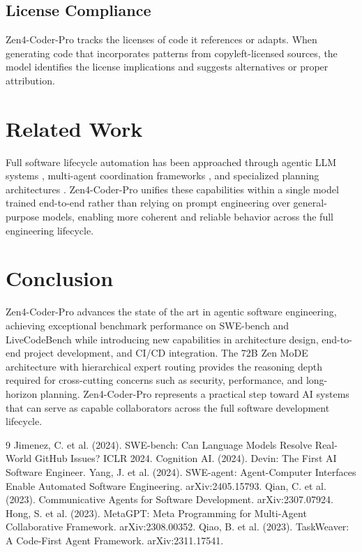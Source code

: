 \documentclass[11pt,a4paper]{article}
\begin{document}
\subsection{License Compliance}

Zen4-Coder-Pro tracks the licenses of code it references or adapts. When generating code that incorporates patterns from copyleft-licensed sources, the model identifies the license implications and suggests alternatives or proper attribution.

\section{Related Work}

Full software lifecycle automation has been approached through agentic LLM systems \cite{devin,swebenchagent}, multi-agent coordination frameworks \cite{chatdev,metagpt}, and specialized planning architectures \cite{taskweaver}. Zen4-Coder-Pro unifies these capabilities within a single model trained end-to-end rather than relying on prompt engineering over general-purpose models, enabling more coherent and reliable behavior across the full engineering lifecycle.

\section{Conclusion}

Zen4-Coder-Pro advances the state of the art in agentic software engineering, achieving exceptional benchmark performance on SWE-bench and LiveCodeBench while introducing new capabilities in architecture design, end-to-end project development, and CI/CD integration. The 72B Zen MoDE architecture with hierarchical expert routing provides the reasoning depth required for cross-cutting concerns such as security, performance, and long-horizon planning. Zen4-Coder-Pro represents a practical step toward AI systems that can serve as capable collaborators across the full software development lifecycle.

\begin{thebibliography}{9}
 Jimenez, C. et al. (2024). SWE-bench: Can Language Models Resolve Real-World GitHub Issues? ICLR 2024.
 Cognition AI. (2024). Devin: The First AI Software Engineer.
 Yang, J. et al. (2024). SWE-agent: Agent-Computer Interfaces Enable Automated Software Engineering. arXiv:2405.15793.
 Qian, C. et al. (2023). Communicative Agents for Software Development. arXiv:2307.07924.
 Hong, S. et al. (2023). MetaGPT: Meta Programming for Multi-Agent Collaborative Framework. arXiv:2308.00352.
 Qiao, B. et al. (2023). TaskWeaver: A Code-First Agent Framework. arXiv:2311.17541.
\end{thebibliography}
\end{document}
